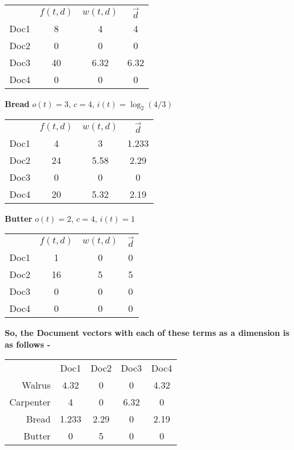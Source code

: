 \documentclass{article}
\begin{document}
\begin{tabular}{ r|c|c|c| }
\multicolumn{1}{r}{}
 & \multicolumn{1}{c}{$f(t,d)$}
 & \multicolumn{1}{c}{$w(t,d)$}
 & \multicolumn{1}{c}{$\vec{d}$} \\
\cline{2-4}
Doc1 & 8 & 4 & 4 \\
\cline{2-4}
Doc2 & 0 & 0 & 0 \\
\cline{2-4}
Doc3 & 40 & 6.32 & 6.32 \\
\cline{2-4}
Doc4 & 0 & 0 & 0 \\
\cline{2-4}
\end{tabular}

\vspace{5mm}
\textbf{Bread}
$o(t) = 3$, $c = 4$, $i(t) = \log_2(4/3)$

\begin{tabular}{ r|c|c|c| }
\multicolumn{1}{r}{}
 & \multicolumn{1}{c}{$f(t,d)$}
 & \multicolumn{1}{c}{$w(t,d)$}
 & \multicolumn{1}{c}{$\vec{d}$} \\
\cline{2-4}
Doc1 & 4 & 3 & 1.233 \\
\cline{2-4}
Doc2 & 24 & 5.58 & 2.29 \\
\cline{2-4}
Doc3 & 0 & 0 & 0 \\
\cline{2-4}
Doc4 & 20 & 5.32 & 2.19 \\
\cline{2-4}
\end{tabular}

\vspace{5mm}
\textbf{Butter}
$o(t) = 2$, $c = 4$, $i(t) = 1$


\begin{tabular}{ r|c|c|c| }
\multicolumn{1}{r}{}
 & \multicolumn{1}{c}{$f(t,d)$}
 & \multicolumn{1}{c}{$w(t,d)$}
 & \multicolumn{1}{c}{$\vec{d}$} \\
\cline{2-4}
Doc1 & 1 & 0 & 0 \\
\cline{2-4}
Doc2 & 16 & 5 & 5 \\
\cline{2-4}
Doc3 & 0 & 0 & 0 \\
\cline{2-4}
Doc4 & 0 & 0 & 0 \\
\cline{2-4}
\end{tabular}

\vspace{5mm}
\textbf{So, the Document vectors with each of these terms as a dimension is as follows - }

\begin{tabular}{ r|c|c|c|c| }
\multicolumn{1}{r}{}
 & \multicolumn{1}{c}{Doc1}
 & \multicolumn{1}{c}{Doc2}
 & \multicolumn{1}{c}{Doc3}
 & \multicolumn{1}{c}{Doc4} \\
\cline{2-5}
Walrus & 4.32 & 0 & 0 & 4.32 \\
\cline{2-5}
Carpenter & 4 & 0 & 6.32 & 0 \\
\cline{2-5}
Bread & 1.233 & 2.29 & 0 & 2.19 \\
\cline{2-5}
Butter & 0 & 5 & 0 & 0 \\
\cline{2-5}
\end{tabular}
\end{document}
